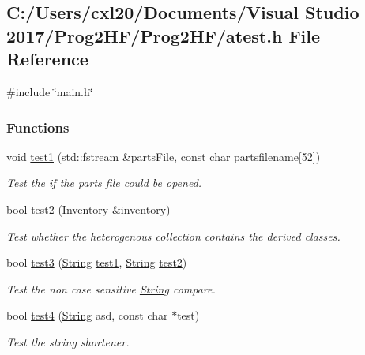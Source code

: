 \subsection{C\+:/\+Users/cxl20/\+Documents/\+Visual Studio 2017/\+Prog2\+H\+F/\+Prog2\+H\+F/atest.h File Reference}
\label{atest_8h}
{\ttfamily \#include \char`\"{}main.\+h\char`\"{}}\newline
\subsubsection*{Functions}
\begin{DoxyCompactItemize}
\item 
void \mbox{\hyperlink{atest_8h_a377b49f7a65ef678441feafbbb111fd0}{test1}} (std\+::fstream \&parts\+File, const char partsfilename\mbox{[}52\mbox{]})
\begin{DoxyCompactList}\small\item\em Test the if the parts file could be opened. \end{DoxyCompactList}\item 
bool \mbox{\hyperlink{atest_8h_a4e5e4ea94633fee304b7f4490e655591}{test2}} (\mbox{\hyperlink{class_inventory}{Inventory}} \&inventory)
\begin{DoxyCompactList}\small\item\em Test whether the heterogenous collection contains the derived classes. \end{DoxyCompactList}\item 
bool \mbox{\hyperlink{atest_8h_a6e6df2af48d16780853d6eddcb8c8bc4}{test3}} (\mbox{\hyperlink{class_string}{String}} \mbox{\hyperlink{atest_8h_a377b49f7a65ef678441feafbbb111fd0}{test1}}, \mbox{\hyperlink{class_string}{String}} \mbox{\hyperlink{atest_8h_a4e5e4ea94633fee304b7f4490e655591}{test2}})
\begin{DoxyCompactList}\small\item\em Test the non case sensitive \mbox{\hyperlink{class_string}{String}} compare. \end{DoxyCompactList}\item 
bool \mbox{\hyperlink{atest_8h_ab545ece7a108a6470a3dc2161ba0008b}{test4}} (\mbox{\hyperlink{class_string}{String}} asd, const char $\ast$test)
\begin{DoxyCompactList}\small\item\em Test the string shortener. \end{DoxyCompactList}\end{DoxyCompactItemize}


